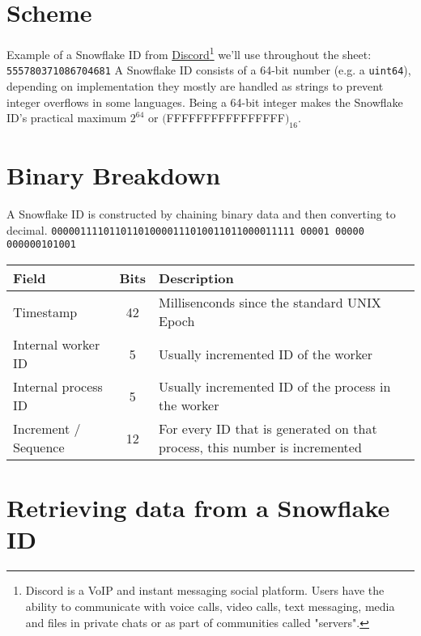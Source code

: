 \documentclass{article}
\newcommand{\code}[1]{\colorbox{cverbbg}{\texttt{#1}}}
\newcommand{\hn}[0]{\hfill \newline}
\begin{document}
\section{Scheme}
Example of a Snowflake ID from \href{https://discord.com/}{Discord}\footnote{Discord is a VoIP and instant messaging social platform. Users have the ability to communicate with voice calls, video calls, text messaging, media and files in private chats or as part of communities called "servers".} we'll use throughout the sheet: \code{555780371086704681} \newline
\hn
A Snowflake ID consists of a 64-bit number (e.g. a \code{uint64}), depending on implementation they mostly are handled as strings to prevent integer overflows in some languages. \newline
\hn
Being a 64-bit integer makes the Snowflake ID's practical maximum
$2^{64}$ or $($FFFFFFFFFFFFFFFF$)_{16}$.


\section{Binary Breakdown}
A Snowflake ID is constructed by chaining binary data and then converting to decimal. \newline
\hn
\large{\texttt{\color{cyan}000001111011011010000111010011011000011111 \color{red}00001 \color{green}00000 \color{gray}000000101001}} \newline

\begin{table}[h]
\begin{tabular}{l|c|l}
Field & Bits & Description \\\hline
Timestamp & \color{cyan}42 & Millisenconds since the standard UNIX Epoch \\\hline
Internal worker ID & \color{red}5 & Usually incremented ID of the worker \\\hline
Internal process ID & \color{green}5 & Usually incremented ID of the process in the worker \\\hline
Increment / Sequence & \color{gray}12 & For every ID that is generated on that process, this number is incremented
\end{tabular}
\end{table}

\pagebreak


\section{Retrieving data from a Snowflake ID}
\end{document}
